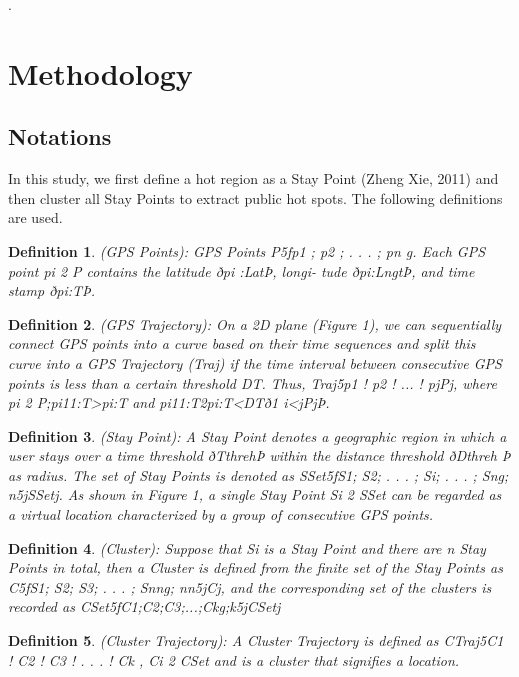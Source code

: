 \documentclass[conference]{IEEEtran}
\newtheorem{mydef}{Definition}
\begin{document}
\cite{bell2007modeling,hofmann1999latent,shen2012learning}.

\section{Methodology}\label{sec:methodology}

\subsection{Notations}
In this study, we first define a hot region as a Stay Point (Zheng  Xie, 2011) and then cluster all Stay Points to extract public hot spots. The following definitions are used.

\begin{mydef}
(GPS Points): GPS Points P5fp1 ; p2 ; . . . ; pn g. Each GPS point pi 2 P contains the latitude ðpi :LatÞ, longi- tude ðpi:LngtÞ, and time stamp ðpi:TÞ.
\end{mydef}

\begin{mydef}
(GPS Trajectory): On a 2D plane (Figure 1), we can sequentially connect GPS points into a curve based on their time sequences and split this curve into a GPS Trajectory (Traj) if the time interval between consecutive GPS points is less than a certain threshold DT. Thus, Traj5p1 ! p2 ! ... ! pjPj, where pi 2 P;pi11:T>pi:T and pi11:T2pi:T<DTð1 i<jPjÞ.
\end{mydef}

\begin{mydef}
(Stay Point): A Stay Point denotes a geographic region in which a user stays over a time threshold ðTthrehÞ within the distance threshold ðDthreh Þ as radius. The set of Stay Points is denoted as SSet5fS1; S2; . . . ; Si; . . . ; Sng; n5jSSetj. As shown in Figure 1, a single Stay Point Si 2 SSet can be regarded as a virtual location characterized by a group of consecutive GPS points.
\end{mydef}

\begin{mydef}
(Cluster): Suppose that Si is a Stay Point and there are n Stay Points in total, then a Cluster is defined from the finite set of the Stay Points as C5fS1; S2; S3; . . . ; Snng; nn5jCj, and the corresponding set of the clusters is recorded as CSet5fC1;C2;C3;...;Ckg;k5jCSetj
\end{mydef}

\begin{mydef}
(Cluster Trajectory): A Cluster Trajectory is defined as CTraj5C1 ! C2 ! C3 ! . . . ! Ck , Ci 2 CSet and is a cluster that signifies a location.
\end{mydef}
\end{document}
